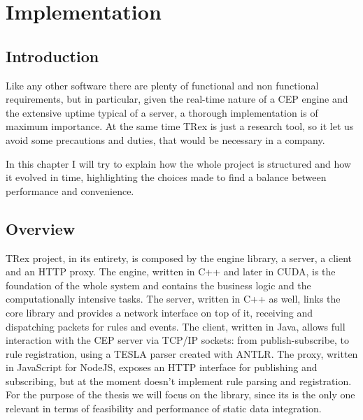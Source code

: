 \chapter{Implementation}

\section{Introduction}
Like any other software there are plenty of functional and non functional requirements, but in particular, given the real-time nature of a CEP engine and the extensive uptime typical of a server, a thorough implementation is of maximum importance. At the same time TRex is just a research tool, so it let us avoid some precautions and duties, that would be necessary in a company.

In this chapter I will try to explain how the whole project is structured and how it evolved in time, highlighting the choices made to find a balance between performance and convenience.

\section{Overview}
TRex project, in its entirety, is composed by the engine library, a server, a client and an HTTP proxy. The engine, written in C++ and later in CUDA, is the foundation of the whole system and contains the business logic and the computationally intensive tasks. The server, written in C++ as well, links the core library and provides a network interface on top of it, receiving and dispatching packets for rules and events. The client, written in Java, allows full interaction with the CEP server via TCP/IP sockets: from publish-subscribe, to rule registration, using a TESLA parser created with ANTLR. The proxy, written in JavaScript for NodeJS, exposes an HTTP interface for publishing and subscribing, but at the moment doesn't implement rule parsing and registration. For the purpose of the thesis we will focus on the library, since its is the only one relevant in terms of feasibility and performance of static data integration.


